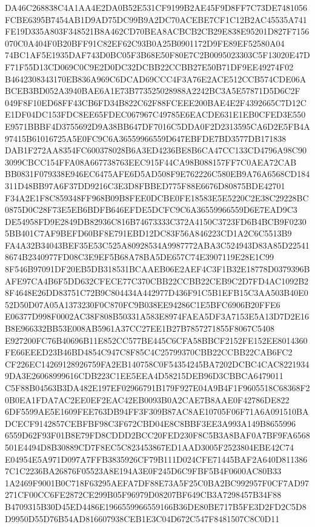 \documentclass[UTF8,fontset=fandol,zihao=-4,a4paper]{ctexart}
\begin{document}
{{DA46C268838C4A1AA4E2DA0B52E531CF9199B2AE45F9D8FF7C73DE7481056FCBE6395B7454AB1D9AD75DC99B9A2DC70ACEBE7CF1C12B2AC45535A741
FE19D335A803F348521B8A462CD70BEA8ACBCB2CB29E838E95201D827F7156070C0A404F0B20BFF91C82EF62C93B0A25B0901172D9FE89EF52580A04
74BC1AF5E1935DAF743D0BC05F3B68E50F80E7C2B0095023303C5F13020E47DF71F55D13CD069C0C9E2D0DC32DCBB22CCBB27E50B71DF9EE49274F02
B4642308343170EB836A969C6DCAD69CCC4F3A76E2ACE512CCB574CDE06ABCEB3BD052A3940BAE6A1E73B773525028988A2242BC3A5E57871D5D6C2F
049F8F10ED68FF43CB6FD34B822C62F88FCEEE200BAE4E2F4392665C7D12CE1DF04DC153FDC8EE65FDEC067967C49785E6EACDE631E1EB0CFED3E550
E9571BBBF4D3755692D9A38BB647DF7016C5DDA0F2D2313595CA6D2E5FB4A97415B61016725A5E0FC9C6A36559966559D647EBFDE7BD3577DB171838
DAB1F272AA8354FC600378028B6A3ED4236BE8B6CA47CC133CD4796A98C903099CBCC154FFA08A667738763EEC915F44CA98B088157FF7C0AEA72CAB
BB0831F079338E946EC6475AFE6D5AD508F9E762226C580EB9A76A6568CD184311D48BB97A6F37DD9216C3E3D8FBBED775F88E6676D80875BDE42701
F34A2E1F8C859348FF968B09B8FEE0DCBE0FE18583E5E5220C2E38C29228BC0875D0C28F73E5EB6BDFB646EFDE5DCFC9C6A36559966559D6E7EAD9C3
DE54958FD9E2849DB82936C816B74673333C372A4150C3723FD6B4BCB9F02305BB401C7AF9BEFD60BF8E791EBD12DC83F56A846223CD1A2C6C5513B9
FA4A32B34043BEF35E53C525A80928534A9987772ABA3C524943D83A85D225418674B2340977FD08C3E9EF5B68A78BA5DE657C74E3907119E28E1C99
8F546B97091DF20EB5DB318531BCAAEB06E2AEF4C3F1B32E18778D0379396BAFE97CA4B6F5DD632CFECE77C370CBB22CCBB22CEB9C2D7FD4AC1092B2
8F4648E26DD83751C72B9C804434A442977D436F91C5B1EFB15C3AA503B40E052D50D07A05A1373230F0C870FC9B038EE94286C1E5BFC6906B20FFE6
E06377D998F0002AC38F808B50331A583E8974FAEA5DF3A7153E5A13D7D2E16B8E966332BB53E008AB5961A37CC27EE1B27B7857271855F8067C5408
E927200FC76B40696B11E852CC577BE445C6CFA58BBCF2152FE152EE8014360FE66EEED23B46BD4854C947C8F85C4C25799370CBB22CCBB22CAB6FC2
CF226EC14269128926759FA2EB140758C0F54354245BA7202DCBC4CAC82219349DA3E26068999616CDB223C1EE5EEA4D58215DEB96D3CBBCA6479011
C5F88B04563B3DA482E197EF02966791B179F927E04A9B4F1F9605518C68368F20B0EA1FDA7AC2EE0EF2EAC42EB0093B0A2CAE7B8AAE0F42786DE822
6DF5599AE5E1609FEE763DB94FF3F309B87AC8AE10705F06F71A6A091510BADCECF9142857CEBFBF98C3F672CBD04E8C8BBF3EE3A993A149B8655996
6559D62F93F01B8E79FD8CDDD2BCC20FED230F8C5B3A8BAF0A7BF9FA6568501E4494D8B30889CD7F8EC5C823453867ED1AAD3005F2523804EBE42C74
E04954E5A971D097A7FFB3835926CF79B111D024CFE71445BAF2A640D8113867C1C2236BA26876F05523A8E194A3E0F245D6C9FBF5B4F0600AC80B33
1A2469F9001B0C718F63295AEFA7DF88E73A5F25C0BA2BC992957F0CF7AD97271CF00CC6FE2872CE299B05F96979D08207BF649CB3A7298457B34F88
B4709315B30D45ED4486E1966559966559166B36DE80BE717B5FE3D2FD2C5D8D9950D55D76B54AD816607938CEB1E3C04D672C547F8481507C8C0D11
}}
\end{document}
